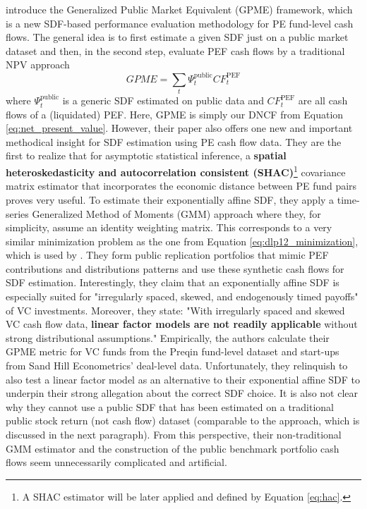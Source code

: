 \documentclass[12pt]{article}
\begin{document}
\cite{KN16} introduce the Generalized Public Market Equivalent (GPME) framework, which is a new SDF-based performance evaluation methodology for PE fund-level cash flows.
The general idea is to first estimate a given SDF just on a public market dataset and then, in the second step, evaluate PEF cash flows by a traditional NPV approach
\[
GPME = \sum_t \Psi_t^{\mathrm{public}} CF_t^{\mathrm{PEF}}
\]
where $\Psi_t^{\mathrm{public}}$ is a generic SDF estimated on public data and $CF_t^{\mathrm{PEF}}$ are all cash flows of a (liquidated) PEF.
Here, GPME is simply our DNCF from Equation \ref{eq:net_present_value}.
However, their paper also offers one new and important methodical insight for SDF estimation using PE cash flow data.
They are the first to realize that for asymptotic statistical inference, a \textbf{spatial heteroskedasticity and autocorrelation consistent (SHAC)}\footnote{A SHAC estimator will be later applied and defined by Equation \ref{eq:hac}.} covariance matrix estimator that incorporates the economic distance between PE fund pairs proves very useful.
To estimate their exponentially affine SDF, they apply a time-series Generalized Method of Moments (GMM) approach where they, for simplicity, assume an identity weighting matrix.
This corresponds to a very similar minimization problem as the one from Equation \ref{eq:dlp12_minimization}, which is used by \cite{DLP12}. 
They form public replication portfolios that mimic PEF contributions and distributions patterns and use these synthetic cash flows for SDF estimation. 
Interestingly, they claim that an exponentially affine SDF is especially suited for "irregularly spaced, skewed, and endogenously timed payoffs" of VC investments.
Moreover, they state: "With irregularly spaced and skewed VC cash flow data, \textbf{linear factor models are not readily applicable} without strong distributional assumptions."
Empirically, the authors calculate their GPME metric for VC funds from the Preqin fund-level dataset and start-ups from Sand Hill Econometrics' deal-level data.
Unfortunately, they relinquish to also test a linear factor model as an alternative to their exponential affine SDF to underpin their strong allegation about the correct SDF choice.
It is also not clear why they cannot use a public SDF that has been estimated on a traditional public stock return (not cash flow) dataset (comparable to the \cite{GSW19} approach, which is discussed in the next paragraph).
From this perspective, their non-traditional GMM estimator and the construction of the public benchmark portfolio cash flows seem unnecessarily complicated and artificial.
\end{document}
